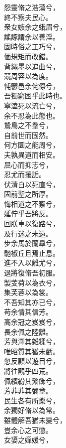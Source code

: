 \begin{pinyinscope}
\begin{shici}
怨靈脩之浩蕩兮，\\
終不察夫民心。\\
衆女嫉余之蛾眉兮，\\
謠諑謂余以善淫。\\
固時俗之工巧兮，\\
偭規矩而改錯。\\
背繩墨以追曲兮，\\
競周容以為度。\\
忳鬱邑余侘傺兮，\\
吾獨窮困乎此時也。\\
寧溘死以流亡兮，\\
余不忍為此態也。\\
鷙鳥之不羣兮，\\
自前世而固然。\\
何方圜之能周兮，\\
夫孰異道而相安。\\
屈心而抑志兮，\\
忍尤而攘詬。\\
伏清白以死直兮，\\
固前聖之所厚。\\
悔相道之不察兮，\\
延佇乎吾將反。\\
回朕車以復路兮，\\
及行迷之未遠。\\
步余馬於蘭臯兮，\\
馳椒丘且焉止息。\\
進不入以離尤兮，\\
退將復脩吾初服。\\
製芰荷以為衣兮，\\
集芙蓉以為裳。\\
不吾知其亦已兮，\\
苟余情其信芳。\\
高余冠之岌岌兮，\\
長余佩之陸離。\\
芳與澤其雜糅兮，\\
唯昭質其猶未虧。\\
忽反顧以遊目兮，\\
將往觀乎四荒。\\
佩繽紛其繁飾兮，\\
芳菲菲其彌章。\\
民生各有所樂兮，\\
余獨好脩以為常。\\
雖體解吾猶未變兮，\\
豈余心之可懲。\\
女嬃之嬋媛兮，\\

\end{shici}
\end{pinyinscope}

